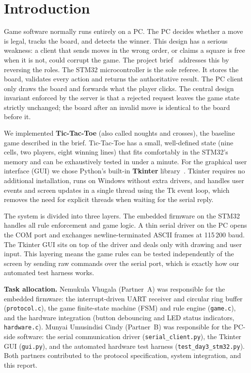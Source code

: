 \section{Introduction}
\label{sec:intro}


Game software normally runs entirely on a PC.
The PC decides whether a move is legal, tracks the board, and detects the winner.
This design has a serious weakness: a client that sends moves in the wrong order, or
claims a square is free when it is not, could corrupt the game.
The project brief~\cite{brief} addresses this by reversing the roles.
The STM32 microcontroller is the sole referee.
It stores the board, validates every action and returns the authoritative result.
The PC client only draws the board and forwards what the player clicks.
The central design invariant enforced by the server is that a rejected request
leaves the game state strictly unchanged; the board after an invalid move is
identical to the board before it.

We implemented \textbf{Tic-Tac-Toe} (also called noughts and crosses), the baseline
game described in the brief.
Tic-Tac-Toe has a small, well-defined state (nine cells, two players, eight winning
lines) that fits comfortably in the STM32's memory and can be exhaustively tested
in under a minute.
For the graphical user interface (GUI) we chose Python's built-in \textbf{Tkinter}
library~\cite{guilib}.
Tkinter requires no additional installation, runs on Windows without extra drivers,
and handles user events and screen updates in a single thread using the Tk event loop,
which removes the need for explicit threads when waiting for the serial reply.

The system is divided into three layers.
The embedded firmware on the STM32 handles all rule enforcement and game logic.
A thin serial driver on the PC opens the COM port and exchanges newline-terminated
ASCII frames at 115\,200 baud.
The Tkinter GUI sits on top of the driver and deals only with drawing and user input.
This layering means the game rules can be tested independently of the screen by
sending raw commands over the serial port, which is exactly how our automated test
harness works.

\textbf{Task allocation.}
Nemukula Vhugala (Partner~A) was responsible for the embedded firmware: the
interrupt-driven UART receiver and circular ring buffer (\texttt{protocol.c}),
the game finite-state machine (FSM) and rule engine (\texttt{game.c}), and the
hardware integration (button debouncing and LED status indicators,
\texttt{hardware.c}).
Munyai Umusindisi Cindy (Partner~B) was responsible for the PC-side software:
the serial communication driver (\texttt{serial\_client.py}), the Tkinter GUI
(\texttt{gui.py}), and the automated hardware test harness
(\texttt{test\_day3\_stm32.py}).
Both partners contributed to the protocol specification, system integration,
and this report.

